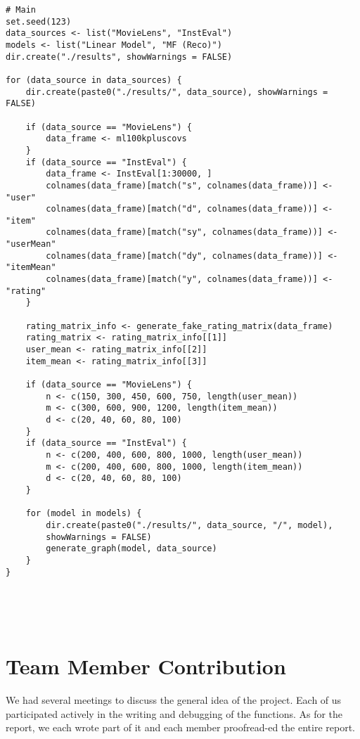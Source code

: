 \documentclass[12pt]{article}
\begin{document}
\begin{singlespace}
\begin{verbatim}
# Main
set.seed(123)
data_sources <- list("MovieLens", "InstEval")
models <- list("Linear Model", "MF (Reco)")
dir.create("./results", showWarnings = FALSE)

for (data_source in data_sources) {
    dir.create(paste0("./results/", data_source), showWarnings = FALSE)

    if (data_source == "MovieLens") {
        data_frame <- ml100kpluscovs
    }
    if (data_source == "InstEval") {
        data_frame <- InstEval[1:30000, ]
        colnames(data_frame)[match("s", colnames(data_frame))] <- "user"
        colnames(data_frame)[match("d", colnames(data_frame))] <- "item"
        colnames(data_frame)[match("sy", colnames(data_frame))] <- "userMean"
        colnames(data_frame)[match("dy", colnames(data_frame))] <- "itemMean"
        colnames(data_frame)[match("y", colnames(data_frame))] <- "rating"
    }

    rating_matrix_info <- generate_fake_rating_matrix(data_frame)
    rating_matrix <- rating_matrix_info[[1]]
    user_mean <- rating_matrix_info[[2]]
    item_mean <- rating_matrix_info[[3]]

    if (data_source == "MovieLens") {
        n <- c(150, 300, 450, 600, 750, length(user_mean))
        m <- c(300, 600, 900, 1200, length(item_mean))
        d <- c(20, 40, 60, 80, 100)
    }
    if (data_source == "InstEval") {
        n <- c(200, 400, 600, 800, 1000, length(user_mean))
        m <- c(200, 400, 600, 800, 1000, length(item_mean))
        d <- c(20, 40, 60, 80, 100)
    }

    for (model in models) {
        dir.create(paste0("./results/", data_source, "/", model),
        showWarnings = FALSE)
        generate_graph(model, data_source)
    }
}





\end{verbatim}
\end{singlespace}
\newpage
\section{Team Member Contribution}
We had several meetings to discuss the general idea of the project. Each of us participated actively in the writing and debugging of the functions. As for the report, we each wrote part of it and each member proofread-ed the entire report. 
\end{document}
